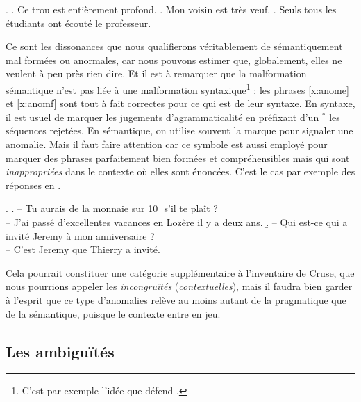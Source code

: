 \begin{refsegment}
\ex.  \label{x:anom3}
\a. Ce trou est {entièrement profond}.
\b. Mon voisin est très veuf.
\b. Seuls tous les étudiants ont écouté le professeur.



Ce sont les dissonances que nous qualifierons véritablement de sémantiquement mal formées ou anormales, car nous pouvons estimer que, globalement, elles ne veulent à peu près rien dire.  Et il est à remarquer que la malformation sémantique n'est pas liée à une malformation syntaxique\footnote{C'est par exemple l'idée que défend \citet[\S2.3]{Chom:57}.} : les phrases \ref{x:anome} et \ref{x:anomf} sont tout à fait correctes pour ce qui est de leur syntaxe.  En syntaxe, il est usuel de marquer les jugements d'agrammaticalité en préfixant d'un $^*$ les séquences rejetées.  En sémantique, on utilise souvent la marque  {\zarb} pour signaler une anomalie.  Mais il faut faire attention car ce symbole est aussi employé pour marquer des phrases parfaitement bien formées et compréhensibles mais qui sont \emph{inappropriées} dans le contexte où elles sont énoncées. C'est le cas par exemple des réponses en \Next.

\ex.
\a. -- Tu aurais de la monnaie sur 10\,\myeuro\ s'il te plaît ?\\
\juge{\zarb} -- J'ai passé d'excellentes vacances en Lozère il y a deux ans.
\b. -- Qui est-ce qui a invité Jeremy à mon anniversaire ?\\
\juge{\zarb} -- C'est Jeremy que Thierry a invité.

Cela pourrait constituer une catégorie supplémentaire à l'inventaire de Cruse,  que nous pourrions appeler les \emph{incongruïtés} (\emph{contextuelles}), mais il faudra bien garder à l'esprit que ce type d'anomalies relève au moins autant de la pragmatique que de la sémantique, puisque le contexte entre en jeu. 






\subsection{Les ambiguïtés}
\label{s:Ambiguïté}

\largerpage[2]


\end{refsegment}
